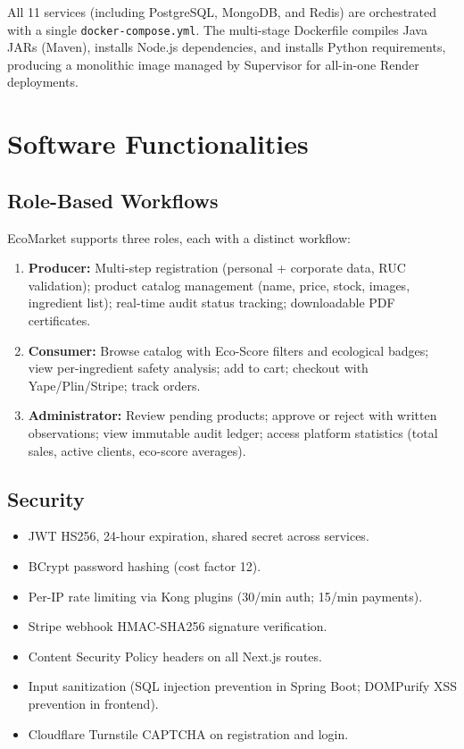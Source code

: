 \documentclass[10pt,a4paper,twocolumn]{article}
\begin{document}
All 11 services (including PostgreSQL, MongoDB, and Redis)
are orchestrated with a single \texttt{docker-compose.yml}.
The multi-stage Dockerfile compiles Java JARs (Maven),
installs Node.js dependencies, and installs Python requirements,
producing a monolithic image managed by Supervisor for
all-in-one Render deployments.

\section{Software Functionalities}

\subsection{Role-Based Workflows}

EcoMarket supports three roles, each with a distinct workflow:

\begin{enumerate}[leftmargin=1.5em, itemsep=3pt]
  \item \textbf{Producer:} Multi-step registration (personal +
    corporate data, RUC validation); product catalog management
    (name, price, stock, images, ingredient list); real-time
    audit status tracking; downloadable PDF certificates.
  \item \textbf{Consumer:} Browse catalog with Eco-Score filters
    and ecological badges; view per-ingredient safety analysis;
    add to cart; checkout with Yape/Plin/Stripe; track orders.
  \item \textbf{Administrator:} Review pending products; approve
    or reject with written observations; view immutable audit
    ledger; access platform statistics (total sales, active
    clients, eco-score averages).
\end{enumerate}

\subsection{Security}

\begin{itemize}[leftmargin=1.2em, itemsep=2pt]
  \item JWT HS256, 24-hour expiration, shared secret across services.
  \item BCrypt password hashing (cost factor 12).
  \item Per-IP rate limiting via Kong plugins (30/min auth;
    15/min payments).
  \item Stripe webhook HMAC-SHA256 signature verification.
  \item Content Security Policy headers on all Next.js routes.
  \item Input sanitization (SQL injection prevention in Spring Boot;
    DOMPurify XSS prevention in frontend).
  \item Cloudflare Turnstile CAPTCHA on registration and login.
\end{itemize}
\end{document}
